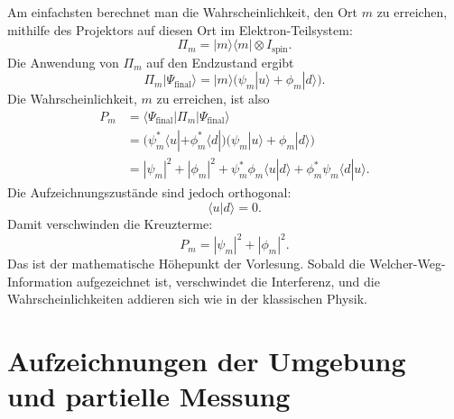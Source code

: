 Am einfachsten berechnet man die Wahrscheinlichkeit, den Ort \(m\) zu erreichen, mithilfe des Projektors auf diesen Ort im Elektron-Teilsystem:
\begin{equation}
\Pi_m = |m\rangle\langle m|\otimes I_{\mathrm{spin}}.
\end{equation}
Die Anwendung von \(\Pi_m\) auf den Endzustand ergibt
\begin{equation}
\Pi_m |\Psi_{\mathrm{final}}\rangle
= |m\rangle\bigl(\psi_m|u\rangle+\phi_m|d\rangle\bigr).
\end{equation}
Die Wahrscheinlichkeit, \(m\) zu erreichen, ist also
\begin{align}
P_m
  &= \langle \Psi_{\mathrm{final}}|\Pi_m|\Psi_{\mathrm{final}}\rangle \\
  &= \bigl(\psi_m^*\langle u|+\phi_m^*\langle d|\bigr)
     \bigl(\psi_m|u\rangle+\phi_m|d\rangle\bigr) \\
  &= |\psi_m|^2 + |\phi_m|^2
     + \psi_m^*\phi_m\langle u|d\rangle
     + \phi_m^*\psi_m\langle d|u\rangle.
\end{align}
Die Aufzeichnungszustände sind jedoch orthogonal:
\begin{equation}
\langle u|d\rangle=0.
\end{equation}
Damit verschwinden die Kreuzterme:
\begin{equation}
P_m = |\psi_m|^2 + |\phi_m|^2.
\end{equation}
Das ist der mathematische Höhepunkt der Vorlesung. Sobald die Welcher-Weg-Information aufgezeichnet ist, verschwindet die Interferenz, und die Wahrscheinlichkeiten addieren sich wie in der klassischen Physik.

\begin{classroomqa}
\end{classroomqa}

\section{Aufzeichnungen der Umgebung und partielle Messung}

